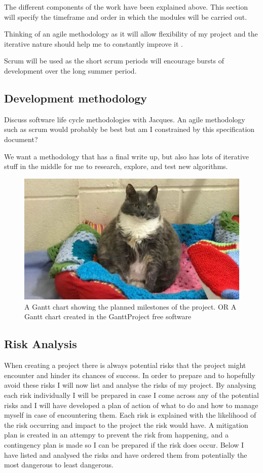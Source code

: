 \documentclass{article}
\begin{document}
The different components of the work have been explained above.
This section will specify the timeframe and order in which the modules will be carried out.

Thinking of an agile methodology as it will allow flexibility of my project and the iterative nature should help me to constantly improve it \cite{beck2001manifesto}. 

Scrum will be used as the short scrum periods will encourage bursts of development over the long summer period.

\subsection{Development methodology}
Discuss software life cycle methodologies with Jacques.
An agile methodology such as scrum would probably be best but am I constrained  by this specification document?

We want a methodology that has a final write up, but also has lots of iterative stuff in the middle for me to research, explore, and test new algorithms.


\begin{figure}[ht]
    \centering
    \includegraphics[scale=0.35]{Test.JPG}
    \caption{A Gantt chart showing the planned milestones of the project. OR A Gantt chart created in the GanttProject free software}
    \label{fig:Gantt}
\end{figure}

\subsection{Risk Analysis}
When creating a project there is always potential risks that the project might encounter and hinder its chances of success. 
In order to prepare and to hopefully avoid these risks I will now list and analyse the risks of my project. 
By analysing each risk individually I will be prepared in case I come across any of the potential risks and I will have developed a plan of action of what to do and how to manage myself in case of encountering them. 
Each risk is explained with the likelihood of the risk occurring and impact to the project the risk would have.
A mitigation plan is created in an attempy to prevent the risk from happening, and a contingency plan is made so I can be prepared if the risk does occur.
Below I have listed and analysed the risks and have ordered them from potentially the most dangerous to least dangerous. 
\end{document}
